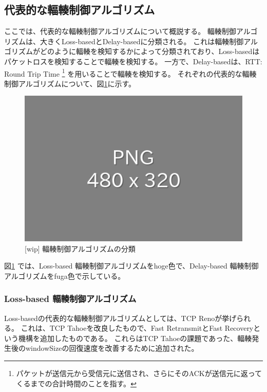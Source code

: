 \documentclass[a4paper,11pt]{jreport}
\newcommand{\figref}[1]{図\ref{#1}}
\begin{document}
\subsection{代表的な輻輳制御アルゴリズム}

ここでは、代表的な輻輳制御アルゴリズムについて概説する。
輻輳制御アルゴリズムは、大きくLoss-basedとDelay-basedに分類される。
これは輻輳制御アルゴリズムがどのように輻輳を検知するかによって分類されており、Loss-basedはパケットロスを検知することで輻輳を検知する。
一方で、Delay-basedは、RTT: Round Trip Time
\footnote{パケットが送信元から受信元に送信され、さらにそのACKが送信元に返ってくるまでの合計時間のことを指す。}
を用いることで輻輳を検知する。
それぞれの代表的な輻輳制御アルゴリズムについて、\figref{figure:congestion_control_classification}に示す。
\begin{figure}[htbp]
  \centering
  \includegraphics[width=0.6\linewidth]{fig/chap02/empty.png}
  \caption{[wip] 輻輳制御アルゴリズムの分類}
  \label{figure:congestion_control_classification}
\end{figure}
\figref{figure:congestion_control_classification} では、Loss-based 輻輳制御アルゴリズムをhoge色で、Delay-based 輻輳制御アルゴリズムをfuga色で示している。

\subsubsection*{Loss-based 輻輳制御アルゴリズム}

Loss-basedの代表的な輻輳制御アルゴリズムとしては、TCP Reno\cite{reno,tcp}が挙げられる。
これは、TCP Tahoe\cite{congestion-avoidance}を改良したもので、Fast RetransmitとFast Recoveryという機構を追加したものである。
これらはTCP Tahoeの課題であった、輻輳発生後のwindowSizeの回復速度を改善するために追加された。
\end{document}
